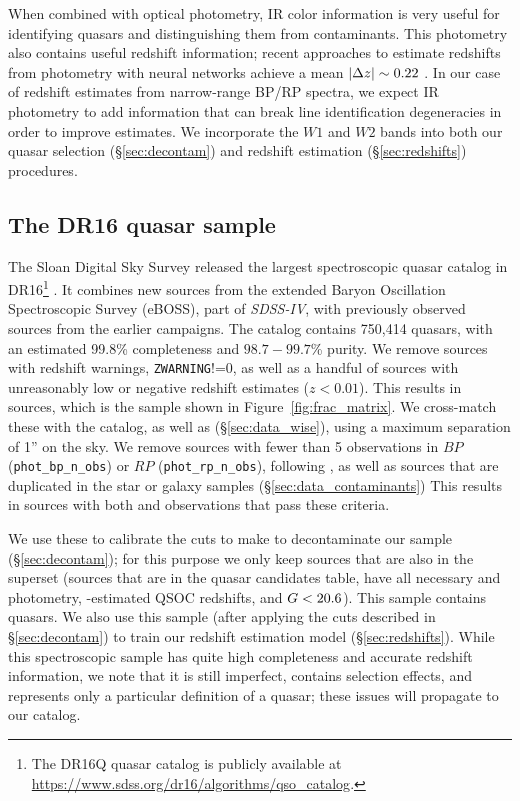 When combined with optical photometry, \unWISE IR color information is very useful for identifying quasars and distinguishing them from contaminants.
This photometry also contains useful redshift information; recent approaches to estimate redshifts from photometry with neural networks achieve a mean $|\Delta z|\sim 0.22$ \citep{yang_quasar_2017, jin_efficient_2019, kunsagi-mate_photometric_2022}.
In our case of redshift estimates from narrow-range BP/RP spectra, we expect IR photometry to add information that can break line identification degeneracies in order to improve estimates.
We incorporate the $W1$ and $W2$ bands into both our quasar selection (\S\ref{sec:decontam}) and redshift estimation (\S\ref{sec:redshifts}) procedures.


\subsection{The \SDSS DR16 quasar sample}
\label{sec:data_sdss_quasars}

The Sloan Digital Sky Survey released the largest spectroscopic quasar catalog in DR16\footnote{The \SDSS DR16Q quasar catalog is publicly available at \url{https://www.sdss.org/dr16/algorithms/qso_catalog}.} \citep{lyke_sloan_2020}.
It combines new sources from the extended Baryon Oscillation Spectroscopic Survey (eBOSS), part of \textsl{SDSS-IV}, with previously observed sources from the earlier \SDSS campaigns.
The catalog contains 750,414 quasars, with an estimated 99.8\% completeness and $98.7-99.7$\% purity.
We remove sources with redshift warnings, \texttt{ZWARNING}!=0, as well as a handful of sources with unreasonably low or negative redshift estimates ($z<0.01$). 
This results in  sources, which is the sample shown in Figure~\ref{fig:frac_matrix}.
We cross-match these with the \Gaia catalog, as well as \unWISE (\S\ref{sec:data_wise}), using a maximum separation of 1'' on the sky.
We remove sources with fewer than 5 observations in $BP$ (\texttt{phot\_bp\_n\_obs}) or $RP$ (\texttt{phot\_rp\_n\_obs}), following \citep{bailer-jones_dsc_2021}, as well as sources that are duplicated in the \SDSS star or galaxy samples (\S\ref{sec:data_contaminants}) 
This results in  sources with both \Gaia and \unWISE observations that pass these criteria.

We use these to calibrate the cuts to make to decontaminate our sample (\S\ref{sec:decontam}); for this purpose we only keep sources that are also in the \cat superset (sources that are in the \Gaia quasar candidates table, have all necessary \Gaia and \unWISE photometry, \Gaia-estimated QSOC redshifts, and $G < 20.6$).
This sample contains  quasars.
We also use this sample (after applying the cuts described in \S\ref{sec:decontam}) to train our redshift estimation model (\S\ref{sec:redshifts}).
While this spectroscopic sample has quite high completeness and accurate redshift information, we note that it is still imperfect, contains selection effects, and represents only a particular definition of a quasar; these issues will propagate to our catalog.


